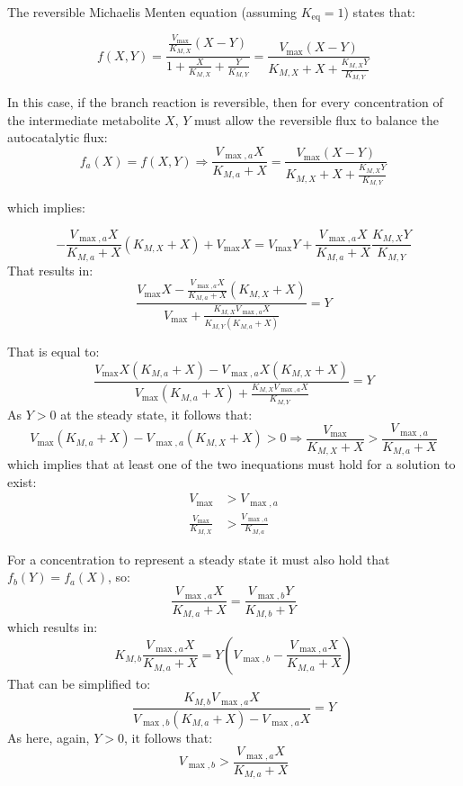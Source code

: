 The reversible Michaelis Menten equation (assuming $K_{\text{eq}}=1$)  states that:

\begin{equation*}
  f(X,Y)=\frac{\frac{V_{\max}}{K_{M,X}}(X-Y)}{1+\frac{X}{K_{M,X}}+\frac{Y}{K_{M,Y}}} = \frac{V_{\max}(X-Y)}{K_{M,X}+X+\frac{K_{M,X}Y}{K_{M,Y}}} 
\end{equation*}

In this case, if the branch reaction is reversible, then for every concentration of the intermediate metabolite $X$, $Y$ must allow the reversible flux to balance the autocatalytic flux:
\begin{equation*}
  f_a(X)=f(X,Y)\Rightarrow \frac{V_{\max,a}X}{K_{M,a}+X}=\frac{V_{\max}(X-Y)}{K_{M,X}+X+\frac{K_{M,X}Y}{K_{M,Y}}}
\end{equation*}

which implies:

\begin{equation*}
  -\frac{V_{\max,a}X}{K_{M,a}+X}(K_{M,X}+X)+V_{\max}X=V_{\max}Y+\frac{V_{\max,a}X}{K_{M,a}+X}\frac{K_{M,X}Y}{K_{M,Y}}
\end{equation*}
That results in:
\begin{equation*}
  \frac{V_{\max}X-\frac{V_{\max,a}X}{K_{M,a}+X}(K_{M,X}+X)}{V_{\max}+\frac{K_{M,X}V_{\max,a}X}{K_{M,Y}(K_{M,a}+X)}}=Y
\end{equation*}

That is equal to:
\begin{equation*}
  \frac{V_{\max}X(K_{M,a}+X)-V_{\max,a}X(K_{M,X}+X)}{V_{\max}(K_{M,a}+X)+\frac{K_{M,X}V_{\max,a}X}{K_{M,Y}}}=Y
\end{equation*}
As $Y>0$ at the steady state, it follows that:
\begin{equation*}
  V_{\max}(K_{M,a}+X)-V_{\max,a}(K_{M,X}+X)>0 \Rightarrow \frac{V_{\max}}{K_{M,X}+X}>\frac{V_{\max,a}}{K_{M,a}+X}
\end{equation*}
which implies that at least one of the two inequations must hold for a solution to exist:
\begin{align*}
  V_{\max} &> V_{\max,a} \\
  \frac{V_{\max}}{K_{M,X}} &>\frac{V_{\max,a}}{K_{M,a}}
\end{align*}


For a concentration to represent a steady state it must also hold that $f_b(Y)=f_a(X)$, so:
\begin{equation*}
    \frac{V_{\max,a}X}{K_{M,a}+X}=\frac{V_{\max,b}Y}{K_{M,b}+Y}
\end{equation*}
which results in:
\begin{equation*}
    K_{M,b}\frac{V_{\max,a}X}{K_{M,a}+X}=Y(V_{\max,b}-\frac{V_{\max,a}X}{K_{M,a}+X})
\end{equation*}
That can be simplified to:
\begin{equation*}
    \frac{K_{M,b}V_{\max,a}X}{V_{\max,b}(K_{M,a}+X)-V_{\max,a}X}=Y
\end{equation*}
As here, again, $Y>0$, it follows that:
\begin{equation*}
  V_{\max,b}>\frac{V_{\max,a}X}{K_{M,a}+X}
\end{equation*}


